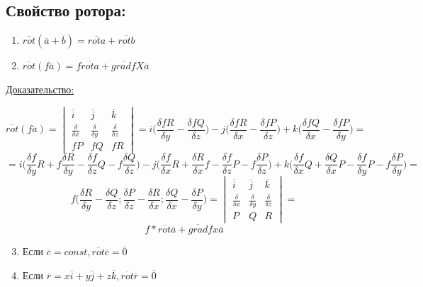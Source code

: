 \documentclass[12pt]{article}
\begin{document}
  \subsection*{Свойство ротора:}
  \begin{enumerate}
    \item $\overline{rot}(\overline{a}+\overline{b}) = \overline{rota}+\overline{rotb}$
    \item $\overline{rot}(f\overline{a}) = f\overline{rota}+\overline{gradf}X\overline{a}$
  \end{enumerate}
  \pagebreak
  \underline{Доказательство:}
  \begin{adjustwidth}{1.5em}{1.5em}
    \[\overline{rot}(f\overline{a}) = 
    \begin{vmatrix}
      \overline{i} & \overline{j} &\overline{k}\\
      \frac{\delta}{\delta x} & \frac{\delta }{\delta y} & \frac{\delta }{\delta z}\\
      fP & fQ & fR
    \end{vmatrix} = 
    i\Big(\frac{\delta fR}{\delta y} - \frac{\delta f Q}{\delta z}\Big) 
   -j\Big(\frac{\delta fR}{\delta x} - \frac{\delta f P}{\delta z}\Big)
   +k\Big(\frac{\delta fQ}{\delta x} - \frac{\delta f P}{\delta y}\Big)=\]
    \[=i\Big(\frac{\delta f}{\delta y}R + f\frac{\delta R}{\delta y} - \frac{\delta f}{\delta z}Q-f\frac{\delta Q}{\delta z}\Big)-
    j\Big(\frac{\delta f}{\delta x}R + \frac{\delta R}{\delta x}f - \frac{\delta f}{\delta z}P - f\frac{\delta P}{\delta z}\Big)+
    k\Big(\frac{\delta f}{\delta x}Q+\frac{\delta Q}{\delta x}P - \frac{\delta f}{\delta y}P - f\frac{\delta P}{\delta y}\Big)=\]
    \[f\Big(\frac{\delta R}{\delta y}-\frac{\delta Q}{\delta z};
        \frac{\delta P}{\delta z}-\frac{\delta R}{\delta x};
        \frac{\delta Q}{\delta x}-\frac{\delta P}{\delta y}\Big)=
    \begin{vmatrix}
      \overline{i} & \overline{j} &\overline{k}\\
      \frac{\delta}{\delta x} & \frac{\delta }{\delta y} & \frac{\delta }{\delta z}\\
      P & Q & R
    \end{vmatrix}=\]
    \[f * \overline{rot}\overline{a}+\overline{grad}f x \overline{a}\]
  \end{adjustwidth}
  \begin{enumerate}
    \setcounter{enumi}{2}
    \item Если $\overline{c}=const,\overline{rot} \overline{c}=\overline{0}$
    \item Если $\overline{r}=x \overline{i}+y\overline{j}+z\overline{k},\overline{rot}\overline{r} = \overline{0}$
  \end{enumerate}
\end{document}
